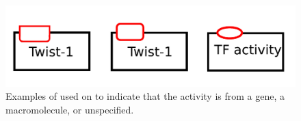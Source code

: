 \begin{figure}[H]
  \centering
  \includegraphics[scale = 0.5]{examples/unitofinformation}
  \caption{Examples of  used on  to indicate that the activity is from a gene, a macromolecule, or unspecified.}
  \label{fig:af:unitofinfo}
\end{figure}
